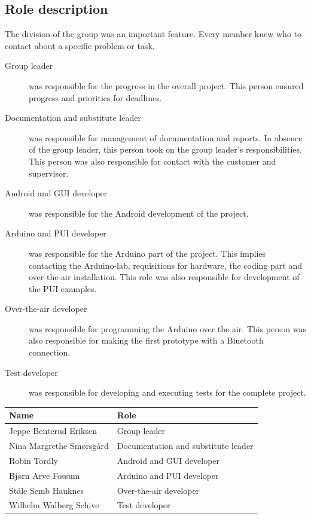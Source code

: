 \subsection{Role description}
The division of the group was an important feature. Every member knew who to contact about a specific problem or task.\\

\begin{description}
	\item[Group leader]{was responsible for the progress in the overall project. This person ensured progress and priorities for deadlines.}
	\item[Documentation and substitute leader]{was responsible for management of documentation and reports. In absence of the group leader, this person took on the group leader's responsibilities. This person was also responsible for contact with the customer and supervisor.}
	\item[Android and GUI developer]{was responsible for the Android development of the project.}
	\item[Arduino and PUI developer]{was responsible for the Arduino part of the project. This implies contacting the Arduino-lab, requisitions for hardware, the coding part and over-the-air installation. This role was also responsible for development of the PUI examples.}
	\item[Over-the-air developer]{was responsible for programming the Arduino over the air. This person was also responsible for making the first prototype with a Bluetooth  connection.}
	\item[Test developer]{was responsible for developing and executing tests for the complete project.}
\end{description}

\begin{table}[H]
\centering
\label{table:teamroles}
\begin{tabular}{|l|l|}
\hline
	\textbf{ Name} & \textbf{Role}\\
\hline
	Jeppe Benterud Eriksen & Group leader\\
\hline
	Nina Margrethe Smørsgård & Documentation and substitute leader\\
\hline
	Robin Tordly & Android and GUI developer\\
\hline
	Bjørn Arve Fossum & Arduino and PUI developer\\
\hline
	Ståle Semb Hauknes & Over-the-air developer\\
\hline
	Wilhelm Walberg Schive & Test developer\\
\hline
\end{tabular}
\end{table}

